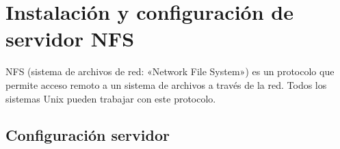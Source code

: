 \section{Instalación y configuración de servidor NFS}


NFS (sistema de archivos de red: «Network File System») es un protocolo que permite acceso remoto a un sistema de archivos a través de la red. Todos los sistemas Unix pueden trabajar con este protocolo.


    
    
    

\subsection{Configuración servidor}

